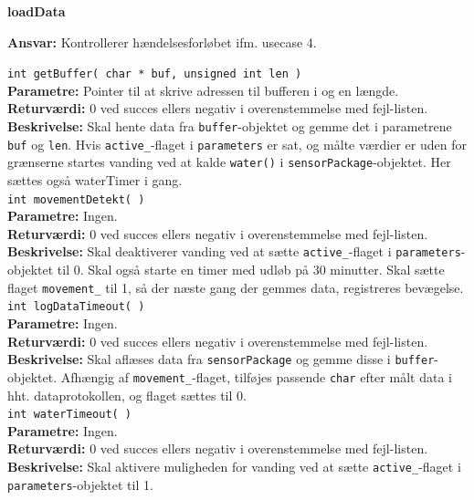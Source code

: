 {\centering
\textbf{loadData}\par
}
\textbf{Ansvar:} Kontrollerer hændelsesforløbet ifm. usecase 4. \

\verb+int getBuffer( char * buf, unsigned int len )+ \\
\textbf{Parametre:} Pointer til at skrive adressen til bufferen i og en længde. \\
\textbf{Returværdi:} 0 ved succes ellers negativ i overenstemmelse med fejl-listen. \\
\textbf{Beskrivelse:} Skal hente data fra \verb+buffer+-objektet og gemme det i parametrene \verb+buf+ og \verb+len+. Hvis \verb+active_+-flaget i \verb+parameters+ er sat, og målte værdier er uden for grænserne startes vanding ved at kalde \verb+water()+ i \verb+sensorPackage+-objektet. Her sættes også waterTimer i gang.\\

\verb+int movementDetekt( )+ \\
\textbf{Parametre:} Ingen. \\
\textbf{Returværdi:} 0 ved succes ellers negativ i overenstemmelse med fejl-listen. \\
\textbf{Beskrivelse:} Skal deaktiverer vanding ved at sætte \verb+active_+-flaget i \verb+parameters+-objektet til 0. Skal også starte en timer med udløb på 30 minutter. Skal sætte flaget \verb+movement_+ til 1, så der næste gang der gemmes data, registreres bevægelse. \\

\verb+int logDataTimeout( )+ \\
\textbf{Parametre:} Ingen. \\
\textbf{Returværdi:} 0 ved succes ellers negativ i overenstemmelse med fejl-listen. \\
\textbf{Beskrivelse:} Skal aflæses data fra \verb+sensorPackage+ og gemme disse i \verb+buffer+-objektet. Afhængig af \verb+movement_+-flaget, tilføjes passende \verb+char+ efter målt data i hht. dataprotokollen, og flaget sættes til 0. \\

\verb+int waterTimeout( )+ \\
\textbf{Parametre:} Ingen. \\
\textbf{Returværdi:} 0 ved succes ellers negativ i overenstemmelse med fejl-listen. \\
\textbf{Beskrivelse:} Skal aktivere muligheden for vanding ved at sætte \verb+active_+-flaget i \verb+parameters+-objektet til 1. \\

